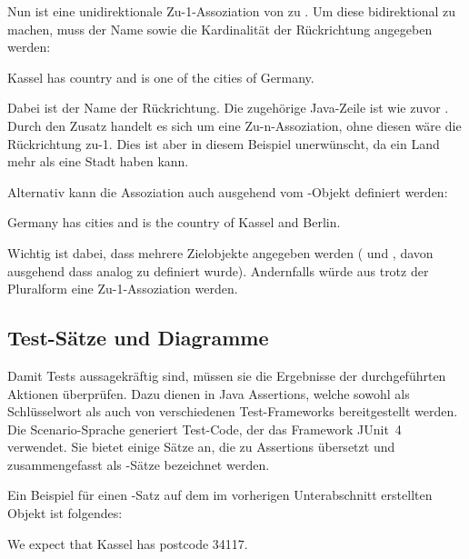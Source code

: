 Nun ist  eine unidirektionale Zu-1-Assoziation von  zu .
Um diese bidirektional zu machen, muss der Name sowie die Kardinalität der Rückrichtung angegeben werden:

\begin{codeblock}
    Kassel has country and is one of the cities of Germany.
\end{codeblock}

Dabei ist  der Name der Rückrichtung.
Die zugehörige Java-Zeile ist wie zuvor .
Durch den Zusatz  handelt es sich um eine Zu-n-Assoziation, ohne diesen wäre die Rückrichtung zu-1.
Dies ist aber in diesem Beispiel unerwünscht, da ein Land mehr als eine Stadt haben kann.

Alternativ kann die Assoziation auch ausgehend vom -Objekt definiert werden:

\begin{codeblock}
    Germany has cities and is the country of Kassel and Berlin.
\end{codeblock}

Wichtig ist dabei, dass mehrere Zielobjekte angegeben werden ( und , davon ausgehend dass  analog zu  definiert wurde).
Andernfalls würde aus  trotz der Pluralform eine Zu-1-Assoziation werden.

\subsection{Test-Sätze und Diagramme}\label{subsec:test-sentences-and-diagrams}

Damit Tests aussagekräftig sind, müssen sie die Ergebnisse der durchgeführten Aktionen überprüfen.
Dazu dienen in Java Assertions, welche sowohl als Schlüsselwort als auch von verschiedenen Test-Frameworks bereitgestellt werden.
Die Scenario-Sprache generiert Test-Code, der das Framework JUnit~4~\cite{junit4} verwendet.
Sie bietet einige Sätze an, die zu Assertions übersetzt und zusammengefasst als -Sätze bezeichnet werden.

Ein Beispiel für einen -Satz auf dem im vorherigen Unterabschnitt erstellten Objekt  ist folgendes:

\begin{codeblock}
    We expect that Kassel has postcode 34117.
\end{codeblock}

